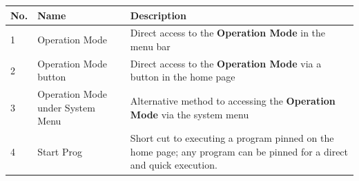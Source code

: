 \begin{longtable}[]{@{}|l|l|l|@{}}
\toprule
\rowcolor{brown}\begin{minipage}[b]{0.04\columnwidth}\raggedright
{\bf{No.}}\strut
\end{minipage} & \begin{minipage}[b]{0.23\columnwidth}\raggedright
{\bf{Name}}\strut
\end{minipage} & \begin{minipage}[b]{0.65\columnwidth}\raggedright
{\bf{Description}}\strut
\end{minipage}\tabularnewline
\midrule
\endhead
\begin{minipage}[t]{0.04\columnwidth}\raggedright
1\strut
\end{minipage} & \begin{minipage}[t]{0.23\columnwidth}\raggedright
Operation Mode\strut
\end{minipage} & \begin{minipage}[t]{0.65\columnwidth}\raggedright
Direct access to the \textbf{Operation Mode} in the menu bar\strut
\end{minipage}\tabularnewline
\begin{minipage}[t]{0.04\columnwidth}\raggedright
2\strut
\end{minipage} & \begin{minipage}[t]{0.23\columnwidth}\raggedright
Operation Mode button\strut
\end{minipage} & \begin{minipage}[t]{0.65\columnwidth}\raggedright
Direct access to the \textbf{Operation Mode} via a button in the home
page\strut
\end{minipage}\tabularnewline
\begin{minipage}[t]{0.04\columnwidth}\raggedright
3\strut
\end{minipage} & \begin{minipage}[t]{0.23\columnwidth}\raggedright
Operation Mode under System Menu\strut
\end{minipage} & \begin{minipage}[t]{0.65\columnwidth}\raggedright
Alternative method to accessing the \textbf{Operation Mode} via the
system menu\strut
\end{minipage}\tabularnewline
\begin{minipage}[t]{0.04\columnwidth}\raggedright
4\strut
\end{minipage} & \begin{minipage}[t]{0.23\columnwidth}\raggedright
Start Prog\strut
\end{minipage} & \begin{minipage}[t]{0.65\columnwidth}\raggedright
Short cut to executing a program pinned on the home page; any program
can be pinned for a direct and quick execution.\strut
\end{minipage}\tabularnewline
\bottomrule
\end{longtable}


